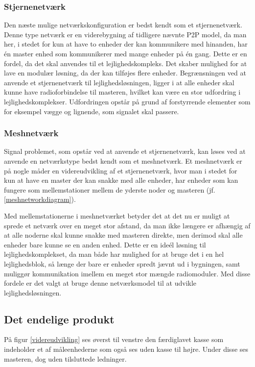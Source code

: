 \subsubsection*{Stjernenetværk}
Den næste mulige netværkskonfiguration  er bedst kendt som et stjernenetværk. Denne type netværk er en viderebygning af tidligere nævnte P2P model, da man her, i stedet for kun at have to enheder der kan kommunikere med hinanden, har én master enhed som kommunikerer med mange enheder på én gang. 
Dette er en fordel, da det skal anvendes til et lejlighedskompleks. Det skaber mulighed for at lave en modulær løsning, da der kan tilføjes flere enheder.
Begrænsningen ved at anvende et stjernenetværk til lejlighedsløsningen, ligger i at alle enheder skal kunne have radioforbindelse til masteren, hvilket kan være en stor udfordring i lejlighedskomplekser. Udfordringen opstår på grund af forstyrrende elementer som for eksempel vægge og lignende, som signalet skal passere.
\newpage
\subsubsection*{Meshnetværk}
Signal problemet, som opstår ved at anvende et stjernenetværk, kan løses ved at anvende en netværkstype bedst kendt som et meshnetværk.
Et meshnetværk er på nogle måder en videreudvikling af et stjernenetværk, hvor man i stedet for kun at have en master der kan snakke med alle enheder, har enheder som kan fungere som mellemstationer mellem de yderste noder og masteren (jf. \ref{meshnetworkdiagram}).


Med mellemstationerne i meshnetværket betyder det at det nu er muligt at sprede et netværk over en meget stor afstand, da man ikke længere er afhængig af at alle noderne skal kunne snakke med masteren direkte, men derimod skal alle enheder bare kunne se en anden enhed. Dette er en ideél løsning til lejlighedskomplekset, da man både har mulighed for at bruge det i en hel lejlighedsblok, så længe der bare er enheder spredt jævnt ud i bygningen, samt muliggør kommunikation imellem en meget stor mængde radiomoduler. Med disse fordele er det valgt at bruge denne netværksmodel til at udvikle lejlighedsløsningen.
\newpage
\subsection{Det endelige produkt}
På figur \ref{videreudvikling} ses øverst til venstre den færdiglavet kasse som indeholder et af måleenhederne som også ses uden kasse til højre. Under disse ses masteren, dog uden tilsluttede ledninger.

